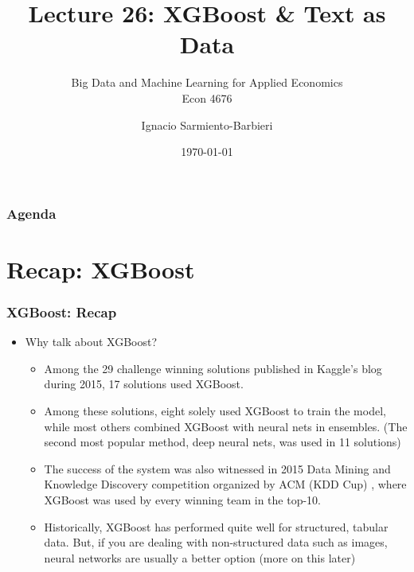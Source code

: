 \documentclass[
  shownotes,
  xcolor={svgnames},
  hyperref={colorlinks,citecolor=DarkBlue,linkcolor=DarkRed,urlcolor=DarkBlue}
  , aspectratio=169]{beamer}
\begin{document}
 
\title[Lecture 26]{Lecture 26:  XGBoost \& Text as Data}
\subtitle{Big Data and Machine Learning for Applied Economics \\ Econ 4676}
\date{\today}

\author[Sarmiento-Barbieri]{Ignacio Sarmiento-Barbieri}


\begin{frame}[noframenumbering]
\maketitle
\end{frame}






\begin{frame}
\frametitle{Agenda}

\tableofcontents

\end{frame}
\section{Recap: XGBoost}
\begin{frame}[fragile]
\frametitle{XGBoost: Recap}

\begin{itemize}

\item Why talk about XGBoost?
\begin{itemize}


 \item Among the 29 challenge winning solutions published in Kaggle's blog during 2015, 17 solutions used XGBoost.  
 \medskip
 \item Among these solutions,  eight  solely  used  XGBoost  to  train  the  model, while most others combined XGBoost with neural nets in ensembles. (The second most popular method, deep  neural  nets,  was  used  in  11  solutions) 
 \medskip
 \item   The  success of the system was also witnessed in 2015 Data Mining and Knowledge Discovery competition organized by ACM (KDD Cup) , where XGBoost  was  used  by  every  winning  team  in  the  top-10. 
 \medskip
 \item Historically, XGBoost has performed quite well for structured, tabular data. But, if you are dealing with non-structured data such as images, neural networks are usually a better option (more on this later)
\end{itemize}
 \end{itemize}
\end{frame}
\end{document}
